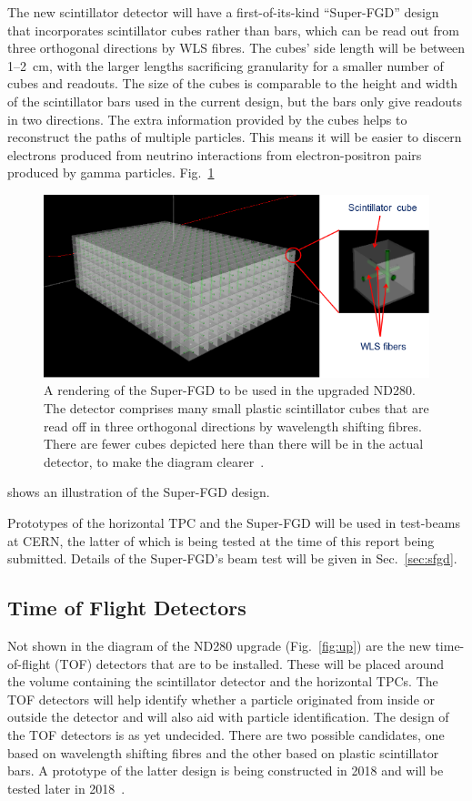 \documentclass[aps,pra,12pt,notitlepage,tightenlines]{revtex4-1}
\begin{document}
The new scintillator detector will have a first-of-its-kind ``Super-FGD'' design that incorporates scintillator cubes rather than bars, which can be read out from three orthogonal directions by WLS fibres. The cubes' side length will be between 1--2~cm, with the larger lengths sacrificing granularity for a smaller number of cubes and readouts. The size of the cubes is comparable to the height and width of the scintillator bars used in the current design, but the bars only give readouts in two directions. The extra information provided by the cubes helps to reconstruct the paths of multiple particles. This means it will be easier to discern electrons produced from neutrino interactions from electron-positron pairs produced by gamma particles. Fig.~\ref{fig:sfgd}
 \begin{figure}
  \includegraphics[scale=0.75]{SFGD.png}
  \caption{A rendering of the Super-FGD to be used in the upgraded ND280. The detector comprises many small plastic scintillator cubes that are read off in three orthogonal directions by wavelength shifting fibres. There are fewer cubes depicted here than there will be in the actual detector, to make the diagram clearer~\cite{Blondel:2299599}.}
  \label{fig:sfgd}
 \end{figure}
shows an illustration of the Super-FGD design.

Prototypes of the horizontal TPC and the Super-FGD will be used in test-beams at CERN, the latter of which is being tested at the time of this report being submitted. Details of the Super-FGD's beam test will be given in Sec.\ \ref{sec:sfgd}.

\subsection{Time of Flight Detectors}
Not shown in the diagram of the ND280 upgrade (Fig.\ \ref{fig:up}) are the new time-of-flight (TOF) detectors that are to be installed. These will be placed around the volume containing the scintillator detector and the horizontal TPCs. The TOF detectors will help identify whether a particle originated from inside or outside the detector and will also aid with particle identification. The design of the TOF detectors is as yet undecided. There are two possible candidates, one based on wavelength shifting fibres and the other based on plastic scintillator bars. A prototype of the latter design is being constructed in 2018 and will be tested later in 2018~\cite{Blondel:2299599}. 
\end{document}
